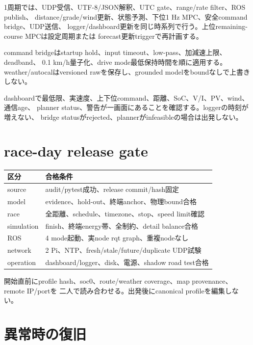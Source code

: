 \documentclass[
  japanese,
  a4paper,
]{article}
\newcounter{none} %
\begin{document}
1周期では、UDP受信、UTF-8/JSON解釈、UTC gate、range/rate filter、ROS
publish、 distance/grade/wind更新、状態予測、下位1 Hz MPC、安全command
bridge、UDP送信、
logger/dashboard更新を同じ時系列で行う。上位remaining-course
MPCは設定周期または forecast更新triggerで再計画する。

command bridgeはstartup hold、input
timeout、low-pass、加減速上限、deadband、 0.1 km/h量子化、drive
mode最低保持時間を順に適用する。weather/autocalはversioned
rawを保存し、grounded modelをboundなしで上書きしない。

dashboardで最低限、実速度、上下位command、距離、SoC、V/I、PV、wind、通信age、
planner
status、警告が一画面にあることを確認する。loggerの時刻が増えない、
bridge statusがrejected、plannerがinfeasibleの場合は出発しない。

\section{race-day release gate}\label{race-day-release-gate}

{\def\LTcaptype{none} %
\begin{longtable}[]{@{}ll@{}}
\toprule\noalign{}
区分 & 合格条件 \\
\midrule\noalign{}
\endhead
\bottomrule\noalign{}
\endlastfoot
source & audit/pytest成功、release commit/hash固定 \\
model & evidence、hold-out、終端anchor、物理bound合格 \\
race & 全距離、schedule、timezone、stop、speed limit確認 \\
simulation & finish、終端energy帯、全制約、detail balance合格 \\
ROS & 4 mode起動、実node rqt graph、重複nodeなし \\
network & 2 Pi、NTP、fresh/stale/future/duplicate UDP試験 \\
operation & dashboard/logger、disk、電源、shadow road test合格 \\
\end{longtable}
}

開始直前にprofile hash、soc0、route/weather coverage、map
provenance、remote IP/portを 二人で読み合わせる。出発後にcanonical
profileを編集しない。

\section{異常時の復旧}\label{ux7570ux5e38ux6642ux306eux5fa9ux65e7}
\end{document}
